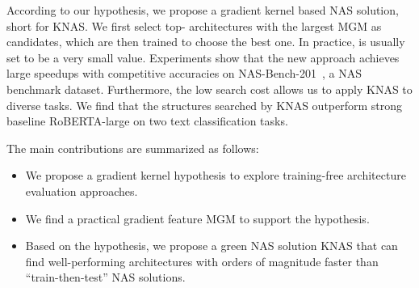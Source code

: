 According to our hypothesis, we propose a gradient kernel based NAS solution, short for KNAS. We first select top- architectures with the largest MGM as candidates, which are then trained to choose the best one. In practice,  is usually set to be a very small value. Experiments show that the new approach achieves large speedups with competitive accuracies on NAS-Bench-201~\citep{DBLP:conf/iclr/Dong020}, a NAS benchmark dataset. Furthermore, the low search cost allows us to apply KNAS to diverse tasks. We find that the structures searched by KNAS outperform strong baseline RoBERTA-large on two text classification tasks.  
























The main contributions are summarized as follows:
\begin{itemize}

\item We propose a gradient kernel hypothesis to explore training-free architecture evaluation approaches. 


\item We find a practical gradient feature MGM to support the hypothesis.


\item Based on the hypothesis, we propose a green NAS solution KNAS that can find well-performing architectures with orders of magnitude faster than ``train-then-test'' NAS solutions. 
\end{itemize}


